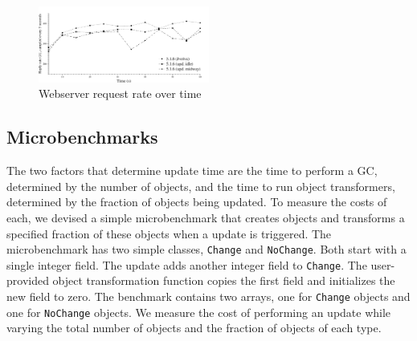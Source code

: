 
\begin{figure}[t]
\begin{center}
\includegraphics[width=0.5\textwidth]{jetty}
\caption{Webserver request rate over time\label{fig:jetty}}
\label{fig:jetty-rate}
\end{center}
\end{figure}

\subsection{Microbenchmarks}
\label{subsec:microbench}

The two factors that determine \DSU{} update time are the time to
perform a GC, determined by the number of objects, and the time to run
object transformers, determined by the fraction of objects being
updated. To measure the costs of each, we devised a simple
microbenchmark that creates objects and transforms a specified
fraction of these objects when a \DSU{} update is triggered. The
microbenchmark has two simple classes, \texttt{Change} and
\texttt{NoChange}.  Both start with a single integer field.  The
update adds another integer field to \texttt{Change}.  The
user-provided object transformation function copies the first field and
initializes the new field to zero.  The benchmark contains two arrays,
one for \texttt{Change} objects and one for \texttt{NoChange} objects.
We measure the cost of performing an update while varying the total
number of objects and the fraction of objects of each type.

